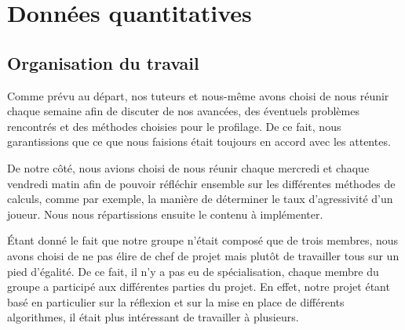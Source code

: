 \documentclass{report}
\begin{document}
\chapter{Données quantitatives}

\section{Organisation du travail}
\hspace{0.5cm}Comme prévu au départ, nos tuteurs et nous-même avons choisi de nous réunir chaque semaine afin de discuter de nos avancées, des éventuels problèmes rencontrés et des méthodes choisies pour le profilage. De ce fait, nous garantissions que ce que nous faisions était toujours en accord avec les attentes.\par
De notre côté, nous avions choisi de nous réunir chaque mercredi et chaque vendredi matin afin de pouvoir réfléchir ensemble sur les différentes méthodes de calculs, comme par exemple, la manière de déterminer le taux d'agressivité d'un joueur. Nous nous répartissions ensuite le contenu à implémenter.\par
Étant donné le fait que notre groupe n'était composé que de trois membres, nous avons choisi de ne pas élire de chef de projet mais plutôt de travailler tous sur un pied d'égalité. De ce fait, il n'y a pas eu de spécialisation, chaque membre du groupe a participé aux différentes parties du projet. En effet, notre projet étant basé en particulier sur la réflexion et sur la mise en place de différents algorithmes, il était plus intéressant de travailler à plusieurs.\par
\end{document}
